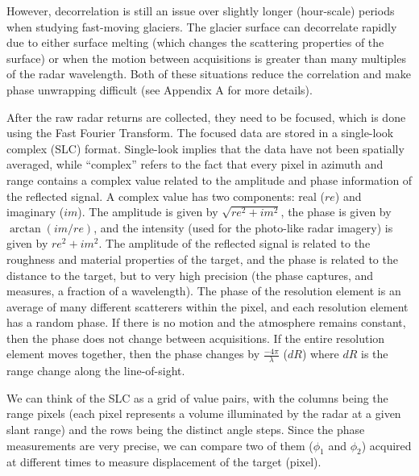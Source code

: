 However, decorrelation is still an issue over slightly longer (hour-scale) periods when studying fast-moving glaciers.  The glacier surface can decorrelate rapidly due to either surface melting (which changes the scattering properties of the surface) or when the motion between acquisitions is greater than many multiples of the radar wavelength. Both of these situations  reduce the correlation and make phase unwrapping difficult (see Appendix A for more details).

After the raw radar returns are collected, they need to be focused, which is done using the Fast Fourier Transform. The focused data are stored in a single-look complex (SLC) format. Single-look implies that the data have not been spatially averaged, while “complex” refers to the fact that every pixel in azimuth and range contains a complex value related to the amplitude and phase information of the reflected signal.   A complex value has two components: real ($re$) and imaginary ($im$). The amplitude is given by $\sqrt{re^2+im^2}$, the phase is given by $\arctan{(im/re)}$, and the intensity (used for the photo-like radar imagery) is given by $re^2+im^2$. The amplitude of the reflected signal is related to the roughness and material properties of the target, and the phase is related to the distance to the target, but to very high precision (the phase captures, and measures, a fraction of a wavelength).  The phase of the resolution element is an average of many different scatterers within the pixel, and each resolution element has a random phase. If there is no motion and the atmosphere remains constant, then the phase does not change between acquisitions. If the entire resolution element moves together, then the phase changes by $\frac{-4\pi}{\lambda}$ ($dR$) where $dR$ is the range change along the line-of-sight.

We can think of the SLC as a grid of value pairs, with the columns being the range pixels (each pixel represents a volume illuminated by the radar at a given slant range) and the rows being the distinct angle steps.  Since the phase measurements are very precise, we can compare two of them ($\phi_1$ and $\phi_2$) acquired at different times to measure displacement of the target (pixel).


